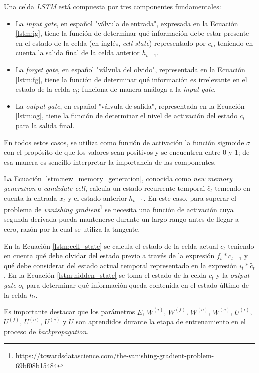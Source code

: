 Una celda \textit{LSTM} está compuesta por tres componentes fundamentales:
\begin{itemize}
  \item La \textit{input gate}, en español "válvula de entrada", expresada en la Ecuación \ref{lstm:ig}, tiene la función de determinar qué información debe estar presente en el estado de la celda (en inglés, \textit{cell state}) representado por $c_{t}$, teniendo en cuenta la salida final de la celda anterior $h_{t-1}$.
  \item La \textit{forget gate}, en español "válvula del olvido", representada en la Ecuación \ref{lstm:fg}, tiene la función de determinar qué información es irrelevante en el estado de la celda $c_{t}$; funciona de manera análoga a la \textit{input gate}.
  \item La \textit{output gate}, en español "válvula de salida", representada en la Ecuación \ref{lstm:og}, tiene la función de determinar el nivel de activación del estado $c_{t}$ para la salida final.
\end{itemize}

En todos estos casos, se utiliza como función de activación la función sigmoide $\sigma$ con el propósito de que los valores sean positivos y se encuentren entre 0 y 1; de esa manera es sencillo interpretar la importancia de las componentes.

La Ecuación \ref{lstm:new_memory_generation}, conocida como \textit{new memory generation} o \textit{candidate cell}, calcula un estado recurrente temporal $\tilde{c_{t}}$ teniendo en cuenta la entrada $x_{t}$ y el estado anterior $h_{t-1}$. En este caso, para superar el problema de \textit{vanishing gradient}\footnote{https://towardsdatascience.com/the-vanishing-gradient-problem-69bf08b15484} se necesita una función de activación cuya segunda derivada pueda mantenerse durante un largo rango antes de llegar a cero, razón por la cual se utiliza la tangente.

En la Ecuación \ref{lstm:cell_state} se calcula el estado de la celda actual $c_{t}$ teniendo en cuenta qué debe olvidar del estado previo a través de la expresión $f_{t}*c_{t-1}$ y qué debe considerar del estado actual temporal representado en la expresión $i_{t}*\tilde{c_{t}}$. En la Ecuación \ref{lstm:hidden_state} se toma el estado de la celda $c_{t}$ y la \textit{output gate} $o_{t}$ para determinar qué información queda contenida en el estado último de la celda $h_{t}$.

Es importante destacar que los parámetros $E$, $W^{(i)}$, $W^{(f)}$, $W^{(o)}$, $W^{(c)}$, $U^{(i)}$, $U^{(f)}$, $U^{(o)}$, $U^{(c)}$ y $U$ son aprendidos durante la etapa de entrenamiento en el proceso de \textit{backpropagation}.

